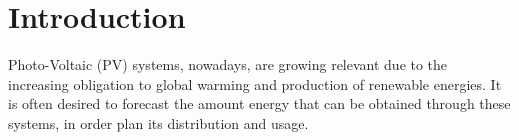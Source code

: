 \section{Introduction}\label{sec:intro}
Photo-Voltaic (PV) systems, nowadays, are growing relevant due to the increasing obligation to global warming and production of renewable energies. It is often desired to forecast the amount energy that can be obtained through these systems, in order plan its distribution and usage.
